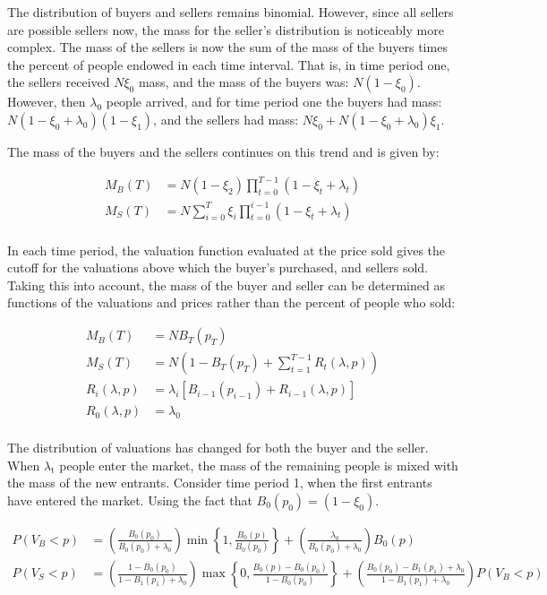 \documentclass[12pt, letterpaper]{paper}
\begin{document}
The distribution of buyers and sellers remains binomial. However,
since all sellers are possible sellers now, the mass for the seller's
distribution is noticeably more complex. The mass of the sellers is
now the sum of the mass of the buyers times the percent of people
endowed in each time interval. That is, in time period one, the
sellers received $N \xi_0$ mass, and the mass of the buyers was:
$N(1-\xi_0)$. However, then $\lambda_0$ people arrived, and for time period one
the buyers had mass: $N( 1 -\xi_0 + \lambda_0)(1-\xi_1)$, and the sellers had mass:
$N \xi_0 + N(1-\xi_0 + \lambda_0)\xi_1$. 

The mass of the buyers and the sellers continues on this trend and is
given by:

\begin{align*}
M_B(T) &= N (1-\xi_2 ) \prod_{t=0}^{T-1} ( 1 - \xi_t + \lambda_t ) \\
M_S(T) &= N \sum_{i = 0}^T \xi_i \prod_{t=0}^{i-1} ( 1- \xi_t + \lambda_t )\\
\end{align*}

In each time period, the valuation function evaluated at the price
sold gives the cutoff for the valuations above which the buyer's
purchased, and sellers sold. Taking this into account, the mass of the
buyer and seller can be determined as functions of the valuations and
prices rather than the percent of people who sold:

\begin{align*}
M_B(T) &= N B_T ( p_T )\\
M_S(T) &= N \left ( 1 - B_T(p_T) + \sum_{t=1}^{T-1}  R_{t}(\lambda,p) \right )\\
R_i(\lambda,p) &= \lambda_i \left [ B_{i-1}(p_{i-1} ) + R_{i-1}(\lambda, p) \right ]\\
R_0 (\lambda,p) &= \lambda_0 \\
\end{align*}

The distribution of valuations has changed for both the buyer and the
seller. When $\lambda$$_{\text{t}}$ people enter the market, the mass of the remaining
people is mixed with the mass of the new entrants. Consider time
period 1, when the first entrants have entered the market. Using the
fact that $B_0 (p_0) = (1-\xi_0)$.

\begin{align*}

P(V_B < p ) &= \left ( \frac{ B_0 ( p_0 ) }{ B_0 (p_0 ) + \lambda_0 } \right )
 \min \left \{ 1, \frac{ B_0 (p) }{ B_0 (p_0 ) } \right \}
 + \left ( \frac{\lambda_0 }{ B_0 (p_0 ) + \lambda_0 } \right ) B_0 (p) \\

P( V_S < p ) &= \left ( \frac{ 1 - B_0 (p_0 )}{ 1 - B_1(p_1 ) + \lambda_0} \right )
 \max \left \{ 0, \frac{ B_0(p) - B_0(p_0 ) }{1 - B_0 ( p_0 ) } \right \}
 + \left ( \frac{ B_0 (p_0 ) - B_1 (p_1) + \lambda_0 }{ 1 - B_1 (p_1) + \lambda_0 } \right ) P( V_B < p )
\end{align*}
\end{document}
